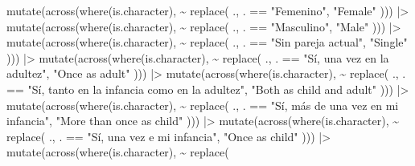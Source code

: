 \documentclass[
  bookmarksnumbered]{article}
\newenvironment{Shaded}{\begin{snugshade}}{\end{snugshade}}
\newcommand{\FunctionTok}[1]{\textcolor[rgb]{0.94,0.94,0.56}{#1}}
\newcommand{\NormalTok}[1]{\textcolor[rgb]{0.80,0.80,0.80}{#1}}
\newcommand{\SpecialCharTok}[1]{\textcolor[rgb]{0.86,0.64,0.64}{#1}}
\newcommand{\StringTok}[1]{\textcolor[rgb]{0.80,0.58,0.58}{#1}}
\begin{document}
\begin{Shaded}
\begin{Highlighting}[]
  \FunctionTok{mutate}\NormalTok{(}\FunctionTok{across}\NormalTok{(}\FunctionTok{where}\NormalTok{(is.character), }\SpecialCharTok{\textasciitilde{}} \FunctionTok{replace}\NormalTok{(}
\NormalTok{    ., . }\SpecialCharTok{==}
      \StringTok{"Femenino"}\NormalTok{,}
    \StringTok{"Female"}
\NormalTok{  ))) }\SpecialCharTok{|\textgreater{}}
  \FunctionTok{mutate}\NormalTok{(}\FunctionTok{across}\NormalTok{(}\FunctionTok{where}\NormalTok{(is.character), }\SpecialCharTok{\textasciitilde{}} \FunctionTok{replace}\NormalTok{(}
\NormalTok{    ., . }\SpecialCharTok{==}
      \StringTok{"Masculino"}\NormalTok{,}
    \StringTok{"Male"}
\NormalTok{  ))) }\SpecialCharTok{|\textgreater{}}
  \FunctionTok{mutate}\NormalTok{(}\FunctionTok{across}\NormalTok{(}\FunctionTok{where}\NormalTok{(is.character), }\SpecialCharTok{\textasciitilde{}} \FunctionTok{replace}\NormalTok{(}
\NormalTok{    ., . }\SpecialCharTok{==}
      \StringTok{"Sin pareja actual"}\NormalTok{,}
    \StringTok{"Single"}
\NormalTok{  ))) }\SpecialCharTok{|\textgreater{}}
  \FunctionTok{mutate}\NormalTok{(}\FunctionTok{across}\NormalTok{(}\FunctionTok{where}\NormalTok{(is.character), }\SpecialCharTok{\textasciitilde{}} \FunctionTok{replace}\NormalTok{(}
\NormalTok{    ., . }\SpecialCharTok{==}
      \StringTok{"Sí, una vez en la adultez"}\NormalTok{,}
    \StringTok{"Once as adult"}
\NormalTok{  ))) }\SpecialCharTok{|\textgreater{}}
  \FunctionTok{mutate}\NormalTok{(}\FunctionTok{across}\NormalTok{(}\FunctionTok{where}\NormalTok{(is.character), }\SpecialCharTok{\textasciitilde{}} \FunctionTok{replace}\NormalTok{(}
\NormalTok{    ., . }\SpecialCharTok{==}
      \StringTok{"Sí, tanto en la infancia como en la adultez"}\NormalTok{,}
    \StringTok{"Both as child and adult"}
\NormalTok{  ))) }\SpecialCharTok{|\textgreater{}}
  \FunctionTok{mutate}\NormalTok{(}\FunctionTok{across}\NormalTok{(}\FunctionTok{where}\NormalTok{(is.character), }\SpecialCharTok{\textasciitilde{}} \FunctionTok{replace}\NormalTok{(}
\NormalTok{    ., . }\SpecialCharTok{==}
      \StringTok{"Sí, más de una vez en mi infancia"}\NormalTok{,}
    \StringTok{"More than once as child"}
\NormalTok{  ))) }\SpecialCharTok{|\textgreater{}}
  \FunctionTok{mutate}\NormalTok{(}\FunctionTok{across}\NormalTok{(}\FunctionTok{where}\NormalTok{(is.character), }\SpecialCharTok{\textasciitilde{}} \FunctionTok{replace}\NormalTok{(}
\NormalTok{    ., . }\SpecialCharTok{==}
      \StringTok{"Sí, una vez e mi infancia"}\NormalTok{,}
    \StringTok{"Once as child"}
\NormalTok{  ))) }\SpecialCharTok{|\textgreater{}}
  \FunctionTok{mutate}\NormalTok{(}\FunctionTok{across}\NormalTok{(}\FunctionTok{where}\NormalTok{(is.character), }\SpecialCharTok{\textasciitilde{}} \FunctionTok{replace}\NormalTok{(}

\end{Highlighting}
\end{Shaded}
\end{document}
